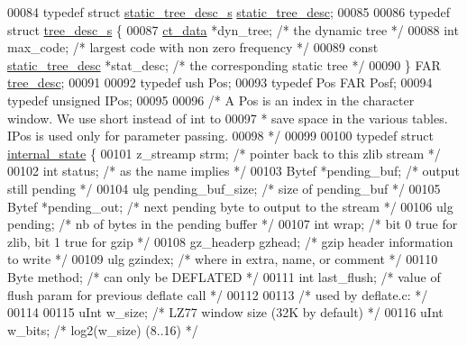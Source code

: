 \begin{DoxyCode}
00084 \textcolor{keyword}{typedef} \textcolor{keyword}{struct }\hyperlink{structstatic__tree__desc__s}{static\_tree\_desc\_s}  \hyperlink{structstatic__tree__desc__s}{static\_tree\_desc};
00085 
00086 \textcolor{keyword}{typedef} \textcolor{keyword}{struct }\hyperlink{structtree__desc__s}{tree\_desc\_s} \{
00087     \hyperlink{structct__data__s}{ct\_data} *dyn\_tree;           \textcolor{comment}{/* the dynamic tree */}
00088     \textcolor{keywordtype}{int}     max\_code;            \textcolor{comment}{/* largest code with non zero frequency */}
00089     \textcolor{keyword}{const} \hyperlink{structstatic__tree__desc__s}{static\_tree\_desc} *stat\_desc;  \textcolor{comment}{/* the corresponding static tree */}
00090 \} FAR \hyperlink{structtree__desc__s}{tree\_desc};
00091 
00092 \textcolor{keyword}{typedef} ush Pos;
00093 \textcolor{keyword}{typedef} Pos FAR Posf;
00094 \textcolor{keyword}{typedef} \textcolor{keywordtype}{unsigned} IPos;
00095 
00096 \textcolor{comment}{/* A Pos is an index in the character window. We use short instead of int to}
00097 \textcolor{comment}{ * save space in the various tables. IPos is used only for parameter passing.}
00098 \textcolor{comment}{ */}
00099 
00100 \textcolor{keyword}{typedef} \textcolor{keyword}{struct }\hyperlink{structinternal__state}{internal\_state} \{
00101     z\_streamp strm;      \textcolor{comment}{/* pointer back to this zlib stream */}
00102     \textcolor{keywordtype}{int}   status;        \textcolor{comment}{/* as the name implies */}
00103     Bytef *pending\_buf;  \textcolor{comment}{/* output still pending */}
00104     ulg   pending\_buf\_size; \textcolor{comment}{/* size of pending\_buf */}
00105     Bytef *pending\_out;  \textcolor{comment}{/* next pending byte to output to the stream */}
00106     ulg   pending;       \textcolor{comment}{/* nb of bytes in the pending buffer */}
00107     \textcolor{keywordtype}{int}   wrap;          \textcolor{comment}{/* bit 0 true for zlib, bit 1 true for gzip */}
00108     gz\_headerp  gzhead;  \textcolor{comment}{/* gzip header information to write */}
00109     ulg   gzindex;       \textcolor{comment}{/* where in extra, name, or comment */}
00110     Byte  method;        \textcolor{comment}{/* can only be DEFLATED */}
00111     \textcolor{keywordtype}{int}   last\_flush;    \textcolor{comment}{/* value of flush param for previous deflate call */}
00112 
00113                 \textcolor{comment}{/* used by deflate.c: */}
00114 
00115     uInt  w\_size;        \textcolor{comment}{/* LZ77 window size (32K by default) */}
00116     uInt  w\_bits;        \textcolor{comment}{/* log2(w\_size)  (8..16) */}

\end{DoxyCode}
